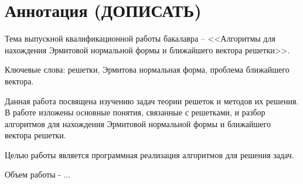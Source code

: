 \newpage
\setcounter{page}{2}

\section*{Аннотация (ДОПИСАТЬ)}

Тема выпускной квалификационной работы бакалавра -- <<Алгоритмы для нахождения Эрмитовой нормальной формы и ближайшего вектора решетки>>.

Ключевые слова: решетки, Эрмитова нормальная форма, проблема ближайшего вектора.

Данная работа посвящена изучению задач теории решеток и методов их решения. В работе изложены основные понятия, связанные с решетками, и разбор алгоритмов для нахождения Эрмитовой нормальной формы и ближайшего вектора решетки. 

Целью работы является программная реализация алгоритмов для решения задач.

Объем работы - ...

\clearpage